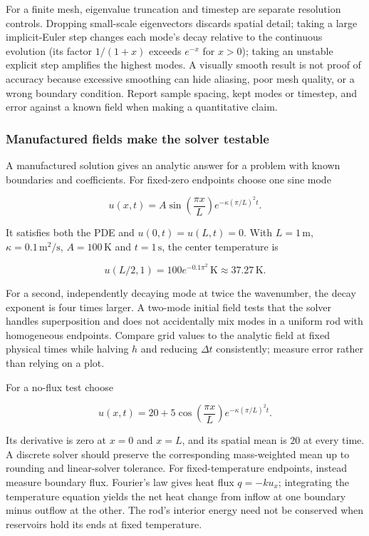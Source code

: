 For a finite mesh, eigenvalue truncation and timestep are separate resolution controls. Dropping small-scale eigenvectors discards spatial detail; taking a large implicit-Euler step changes each mode's decay relative to the continuous evolution (its factor \(1/(1+x)\) exceeds \(e^{-x}\) for \(x>0\)); taking an unstable explicit step amplifies the highest modes. A visually smooth result is not proof of accuracy because excessive smoothing can hide aliasing, poor mesh quality, or a wrong boundary condition. Report sample spacing, kept modes or timestep, and error against a known field when making a quantitative claim.

\subsubsection{Manufactured fields make the solver testable}\label{02-foundations-ii-ch025-manufactured-fields-make-the-solver-testable}

\hypertarget{02-foundations-ii-ch025-manufactured-fields-make-the-solver-testable}{}

A manufactured solution gives an analytic answer for a problem with known boundaries and coefficients. For fixed-zero endpoints choose one sine mode

\[
u(x,t)=A\sin\left(\frac{\pi x}{L}\right)e^{-\kappa(\pi/L)^2t}.
\]

It satisfies both the PDE and \(u(0,t)=u(L,t)=0\). With \(L=1\,\mathrm m\), \(\kappa=0.1\,\mathrm{m^2/s}\), \(A=100\,\mathrm K\) and \(t=1\,\mathrm s\), the center temperature is

\[
u(L/2,1)=100e^{-0.1\pi^2}\,\mathrm K\approx37.27\,\mathrm K.
\]

For a second, independently decaying mode at twice the wavenumber, the decay exponent is four times larger. A two-mode initial field tests that the solver handles superposition and does not accidentally mix modes in a uniform rod with homogeneous endpoints. Compare grid values to the analytic field at fixed physical times while halving \(h\) and reducing \(\Delta t\) consistently; measure error rather than relying on a plot.

For a no-flux test choose

\[
u(x,t)=20+5\cos\left(\frac{\pi x}{L}\right)e^{-\kappa(\pi/L)^2t}.
\]

Its derivative is zero at \(x=0\) and \(x=L\), and its spatial mean is \(20\) at every time. A discrete solver should preserve the corresponding mass-weighted mean up to rounding and linear-solver tolerance. For fixed-temperature endpoints, instead measure boundary flux. Fourier's law gives heat flux \(q=-k u_x\); integrating the temperature equation yields the net heat change from inflow at one boundary minus outflow at the other. The rod's interior energy need not be conserved when reservoirs hold its ends at fixed temperature.


